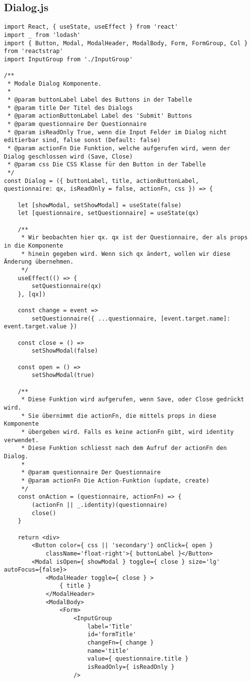 \subsection{Dialog.js}

\begin{verbatim}
import React, { useState, useEffect } from 'react'
import _ from 'lodash'
import { Button, Modal, ModalHeader, ModalBody, Form, FormGroup, Col } from 'reactstrap'
import InputGroup from './InputGroup'

/**
 * Modale Dialog Komponente.
 * 
 * @param buttonLabel Label des Buttons in der Tabelle
 * @param title Der Titel des Dialogs
 * @param actionButtonLabel Label des 'Submit' Buttons
 * @param questionnaire Der Questionnaire
 * @param isReadOnly True, wenn die Input Felder im Dialog nicht editierbar sind, false sonst (Default: false)
 * @param actionFn Die Funktion, welche aufgerufen wird, wenn der Dialog geschlossen wird (Save, Close)
 * @param css Die CSS Klasse für den Button in der Tabelle
 */
const Dialog = ({ buttonLabel, title, actionButtonLabel, questionnaire: qx, isReadOnly = false, actionFn, css }) => {

    let [showModal, setShowModal] = useState(false)
    let [questionnaire, setQuestionnaire] = useState(qx)
    
    /**
     * Wir beobachten hier qx. qx ist der Questionnaire, der als props in die Komponente
     * hinein gegeben wird. Wenn sich qx ändert, wollen wir diese Änderung übernehmen.
     */
    useEffect(() => {
        setQuestionnaire(qx)
    }, [qx])

    const change = event => 
        setQuestionnaire({ ...questionnaire, [event.target.name]: event.target.value })

    const close = () => 
        setShowModal(false)

    const open = () => 
        setShowModal(true)

    /**
     * Diese Funktion wird aufgerufen, wenn Save, oder Close gedrückt wird.
     * Sie übernimmt die actionFn, die mittels props in diese Komponente 
     * übergeben wird. Falls es keine actionFn gibt, wird identity verwendet.
     * Diese Funktion schliesst nach dem Aufruf der actionFn den Dialog.
     * 
     * @param questionnaire Der Questionnaire
     * @param actionFn Die Action-Funktion (update, create)
     */
    const onAction = (questionnaire, actionFn) => {
        (actionFn || _.identity)(questionnaire)
        close()
    }
    
    return <div>
        <Button color={ css || 'secondary'} onClick={ open }
            className='float-right'>{ buttonLabel }</Button>
        <Modal isOpen={ showModal } toggle={ close } size='lg' autoFocus={false}>
            <ModalHeader toggle={ close } >
                { title }
            </ModalHeader>
            <ModalBody>
                <Form>
                    <InputGroup 
                        label='Title'
                        id='formTitle'
                        changeFn={ change }
                        name='title'
                        value={ questionnaire.title }
                        isReadOnly={ isReadOnly }
                    />


\end{verbatim}
